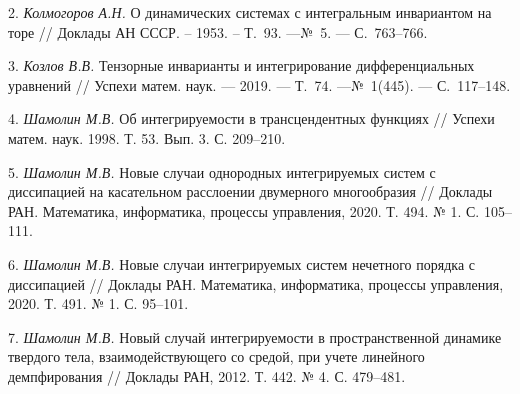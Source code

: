 2. {\it Колмогоров А.Н.} О динамических системах с интегральным инвариантом на торе
// Доклады АН СССР. -- 1953. -- Т.~93. ---№~5. --- С.~763--766.

3. {\it Козлов В.В.} Тензорные инварианты и интегрирование дифференциальных
уравнений // Успехи матем. наук. --- 2019. --- Т.~74. ---№~1(445). --- С.~117--148.

4. {\it Шамолин М.В.} Об интегрируемости в трансцендентных функциях // Успехи матем. наук. 1998. Т. 53. Вып. 3. С. 209–210.

5. {\it Шамолин М.В.} Новые случаи однородных интегрируемых систем с диссипацией на касательном расслоении двумерного многообразия // Доклады РАН. Математика, информатика, процессы управления, 2020. Т. 494. № 1. С. 105–111.

6. {\it Шамолин М.В.} Новые случаи интегрируемых систем нечетного порядка с диссипацией // Доклады РАН. Математика, информатика, процессы управления, 2020. Т. 491. № 1. С. 95–101.

7. {\it Шамолин М.В.} Новый случай интегрируемости в пространственной динамике твердого тела, взаимодействующего со средой, при учете линейного демпфирования // Доклады РАН, 2012. Т. 442. № 4. С. 479–481.


